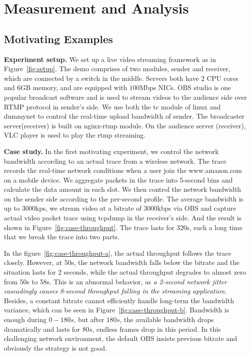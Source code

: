 \section{Measurement and Analysis}
\subsection{Motivating Examples}

\textbf{Experiment setup.} We set up a live video streaming framework as in Figure~\ref{fig:setup}. The demo comprises of two modules, sender and receiver, which are connected by a switch in the middle. Servers both have 2 CPU cores and 6GB memory, and are equipped with $100$Mbps NICs. OBS studio\cite{OBS} is one popular broadcast software and is used to stream videos to the audience side over RTMP protocol in sender's side. We use both the tc module of linux and dummynet\cite{dummynet} to control the real-time upload bandwidth of sender. The broadcaster server(receiver) is built on nginx-rtmp module. On the audience server (receiver), VLC player is used to play the rtmp streaming.


\textbf{Case study.} In the first motivating experiment, we control the network bandwidth according to an actual trace from a wireless network. The trace records the real-time network conditions when a user join the www.amazon.com on a mobile device. We aggregate packets in the trace into 5-second bins and calculate the data amount in each slot. We then control the network bandwidth on the sender side according to the per-second profile. The average bandwidth is up to $3000$kps, we stream video at a bitrate of $3000$kbps via OBS and capture actual video packet trace using tcpdump in the receiver's side. And the result is shown in Figure~\ref{fig:case-throughput}.  The trace lasts for $320$s, such a long time that we break the trace into two parts.

In the figure~\ref{fig:case-throughput-a}, the actual throughput follows the trace closely. However, at 50s, the network bandwidth falls below the bitrate and the situation lasts for 2 seconds, while the actual throughput degrades to almost zero from 50s to 58s. This is an abnormal behavior, as \textit{a 2-second network jitter cascadingly causes 8-second throughput falling in the streaming application.} Besides, a constant bitrate cannot efficiently handle long-term the bandwidth variance, which can be seen in Figure~\ref{fig:case-throughput-b}. Bandwidth is enough during $0-180s$, but after $180s$, the available bandwidth drops dramatically and lasts for $80s$, endless frames drop in this period. In this challenging network environment, the default OBS insists previous bitrate and obviously the strategy is not good.

